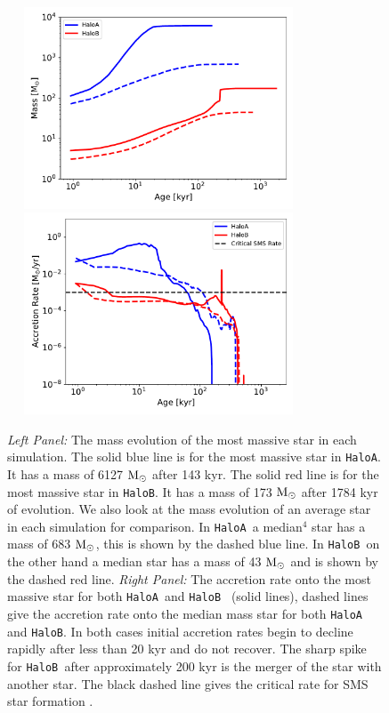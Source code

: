\documentclass[graphics, twocolumn, usenatbib]{mn2e}
\newcommand{\msolar} {$\rm{M_{\odot}}~$}
\newcommand{\msolarc} {$\rm{M_{\odot}}$}
\newcommand{\ha} {\texttt{HaloA~}}
\newcommand{\hb} {\texttt{HaloB~}}
\newcommand{\hbc} {\texttt{HaloB}}
\begin{document}

\begin{figure}
\centering
\begin{minipage}{175mm}      \begin{center}
    \centerline{
      \includegraphics[width=9.0cm, height=6cm]{FIGURES/Mass_MultipleHaloes.pdf}
      \includegraphics[width=9.0cm, height=6cm]{FIGURES/MassAccretionRate_MultipleHaloes.pdf}}
    \caption{
      \textit{Left Panel:} The mass evolution of the most massive star in each simulation. The
      solid blue line is for the most massive star in \texttt{HaloA}. It has a mass of
      6127 \msolar after 143 kyr. The solid red line is for the most massive star in \texttt{HaloB}.
      It has a mass of 173 \msolar after 1784 kyr of evolution. We also look at the mass evolution
      of an average star in each simulation for comparison. In \ha a median$^4$ star has a mass of 683
      \msolarc, this is shown by the dashed blue line. In \hb on the other hand a median star has a
      mass of 43 \msolar and is shown by the dashed red line. 
      \textit{Right Panel:} The accretion rate onto the most massive star for both \ha and \hb
      (solid lines), dashed lines give the accretion rate onto the median mass star for both \ha
      and \hbc. In both cases initial accretion rates begin to decline rapidly after less than
      20 kyr and do not recover. The sharp spike for \hb after approximately 200 kyr is the merger
      of the star with another star. The black dashed line gives the critical rate for SMS
      star formation
      \citep{Haemmerle_2017}.
    }
\label{Fig:AccretionRates}
\end{center} \end{minipage}
\end{figure}
\end{document}
